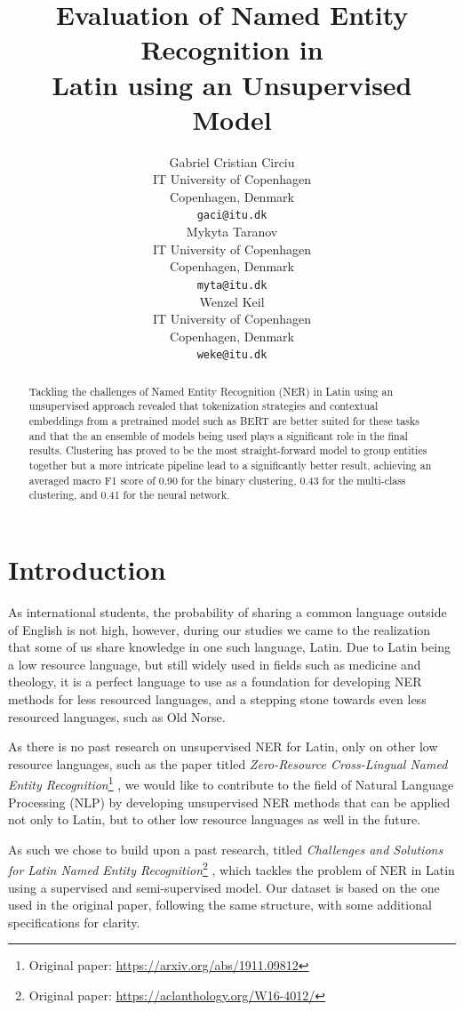 \documentclass[11pt]{article}
\title{Evaluation of Named Entity Recognition in \\ Latin using an Unsupervised Model}
\author{
  Gabriel Cristian Circiu \\
  IT University of Copenhagen \\ Copenhagen, Denmark \\
  \texttt{gaci@itu.dk} \\\And
  Mykyta Taranov \\
  IT University of Copenhagen \\ Copenhagen, Denmark \\
  \texttt{myta@itu.dk} \\\And
  Wenzel Keil \\
  IT University of Copenhagen \\ Copenhagen, Denmark \\
  \texttt{weke@itu.dk}
}
\begin{document}
\maketitle
\begin{abstract}
Tackling the challenges of Named Entity Recognition (NER) in Latin using an unsupervised approach revealed that tokenization strategies 
and contextual embeddings from a pretrained model such as BERT are better suited for these tasks and that the an ensemble of models being 
used plays a significant role in the final results.
Clustering has proved to be the most straight-forward model to group entities together but a more intricate pipeline lead to a significantly 
better result, achieving an averaged macro F1 score of 0.90 for the binary clustering, 0.43 for the multi-class clustering, 
and 0.41 for the neural network.
\end{abstract}

\section{Introduction}

As international students, the probability of sharing a common language outside of English is not high, however, during our studies we came to the 
realization that some of us share knowledge in one such language, Latin. Due to Latin being a low resource language, but still widely used in fields
such as medicine and theology, it is a perfect language to use as a foundation for developing NER methods for less resourced languages, and a
stepping stone towards even less resourced languages, such as Old Norse.

As there is no past research on unsupervised NER for Latin, only on other low resource languages, such as the paper titled
\textit{Zero-Resource Cross-Lingual Named Entity Recognition}\footnote{Original paper: \url{https://arxiv.org/abs/1911.09812}}
\cite{bari2019zeroresourcecrosslingualnamedentity}, we would like to contribute to the field of Natural Language Processing (NLP) by
developing unsupervised NER methods that can be applied not only to Latin, but to other low resource languages as well in the future.

As such we chose to build upon a past research, titled 
\textit{Challenges and Solutions for Latin Named Entity Recognition}\footnote{Original paper: \url{https://aclanthology.org/W16-4012/}}
\cite{erdmann-etal-2016-challenges}, which tackles the problem of NER in Latin using a supervised and semi-supervised model.
Our dataset is based on the one used in the original paper, following the same structure, with some additional specifications for clarity.
\end{document}
